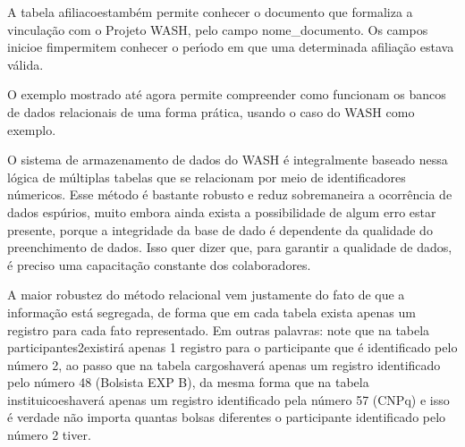 \documentclass[
12pt,		%
openright,	%
twoside,  %
a4paper,			%
chapter=TITLE,		%
english,			%
french,				%
spanish,			%
brazil				%
]{USPSC-classe/USPSC}
\begin{document}
A tabela \textquotedbl afiliacoes\textquotedbl  tamb\'em permite conhecer o documento que formaliza a vincula\c{c}\~ao com o Projeto WASH, pelo campo nome\_documento. Os campos \textquotedbl inicio\textquotedbl  e \textquotedbl fim\textquotedbl  permitem conhecer o per\'{\i}odo em que uma determinada afilia\c{c}\~ao estava v\'alida.














O exemplo mostrado at\'e agora permite compreender como funcionam os bancos de dados relacionais de uma forma pr\'atica, usando o caso do WASH como exemplo.














O sistema de armazenamento de dados do WASH \'e integralmente baseado nessa l\'ogica de m\'ultiplas tabelas que se relacionam por meio de identificadores n\'umericos. Esse m\'etodo \'e bastante robusto e reduz sobremaneira a ocorr\^encia de dados esp\'urios, muito embora ainda exista a possibilidade de algum erro estar presente, porque a integridade da base de dado \'e dependente da qualidade do preenchimento de dados. Isso quer dizer que, para garantir a qualidade de dados, \'e preciso uma capacita\c{c}\~ao constante dos colaboradores.














A maior robustez do m\'etodo relacional vem justamente do fato de que a informa\c{c}\~ao est\'a segregada, de forma que em cada tabela exista apenas um registro para cada fato representado. Em outras palavras: note que na tabela \textquotedbl participantes2\textquotedbl  existir\'a apenas 1 registro para o participante que \'e identificado pelo n\'umero 2, ao passo que na tabela \textquotedbl cargos\textquotedbl  haver\'a apenas um registro identificado pelo n\'umero 48 (Bolsista EXP B), da mesma forma que na tabela \textquotedbl instituicoes\textquotedbl  haver\'a apenas um registro identificado pela n\'umero 57 (CNPq) e isso \'e verdade n\~ao importa quantas bolsas diferentes o participante identificado pelo n\'umero 2 tiver.
\end{document}

